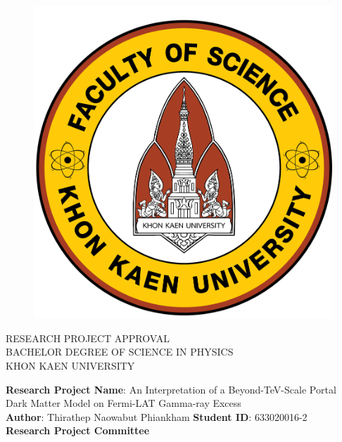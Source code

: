 \documentclass[10pt, oneside]{book}
\numberwithin{equation}{chapter}
\begin{document}
\begin{figure}
	\centering
	\includegraphics[scale=0.05]{logo_eng.png}
\end{figure}
\begin{center}
	RESEARCH PROJECT APPROVAL\\
	BACHELOR DEGREE OF SCIENCE IN PHYSICS\\
	KHON KAEN UNIVERSITY\\
\end{center}
\vspace{0.75cm}
\begin{flushleft}
	\textbf{Research Project Name}: An Interpretation of a Beyond-TeV-Scale Portal Dark Matter Model on Fermi-LAT Gamma-ray Excess \\
	\textbf{Author}: Thirathep Naowabut Phiankham \qquad \textbf{Student ID}: 633020016-2\\
	\vspace{3mm}
	\textbf{Research Project Committee}
	\vspace{0.75cm}
\end{flushleft}
\end{document}
